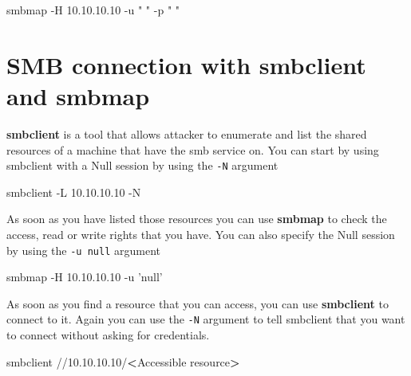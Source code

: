 \documentclass{assets/ipesethesis}
\newenvironment{Shaded}{\begin{snugshade}}{\end{snugshade}}
\newcommand{\ExtensionTok}[1]{#1}
\newcommand{\NormalTok}[1]{#1}
\newcommand{\OperatorTok}[1]{\textcolor[rgb]{0.81,0.36,0.00}{\textbf{#1}}}
\newcommand{\StringTok}[1]{\textcolor[rgb]{0.31,0.60,0.02}{#1}}
\begin{document}
\begin{Shaded}
\begin{Highlighting}[]
\ExtensionTok{smbmap}\NormalTok{ -H 10.10.10.10 -u }\StringTok{" "}\NormalTok{ -p }\StringTok{" "}
\end{Highlighting}
\end{Shaded}

\hypertarget{smb-connection-with-smbclient-and-smbmap}{%
\section*{SMB connection with smbclient and smbmap}\label{smb-connection-with-smbclient-and-smbmap}}

\textbf{smbclient} is a tool that allows attacker to enumerate and list the shared resources of a machine that have the smb service on.
You can start by using smbclient with a Null session by using the \texttt{-N} argument

\begin{Shaded}
\begin{Highlighting}[]
\ExtensionTok{smbclient}\NormalTok{ -L 10.10.10.10 -N}
\end{Highlighting}
\end{Shaded}

As soon as you have listed those resources you can use \textbf{smbmap} to check the access, read or write rights that you have. You can also
specify the Null session by using the \texttt{-u\ \textquotesingle{}null\textquotesingle{}} argument

\begin{Shaded}
\begin{Highlighting}[]
\ExtensionTok{smbmap}\NormalTok{ -H 10.10.10.10 -u }\StringTok{'null'}
\end{Highlighting}
\end{Shaded}

As soon as you find a resource that you can access, you can use \textbf{smbclient} to connect to it. Again you can use the \texttt{-N} argument to tell
smbclient that you want to connect without asking for credentials.

\begin{Shaded}
\begin{Highlighting}[]
\ExtensionTok{smbclient}\NormalTok{ //10.10.10.10/}\OperatorTok{<}\NormalTok{Accessible resource}\OperatorTok{>}
\end{Highlighting}
\end{Shaded}
\end{document}
